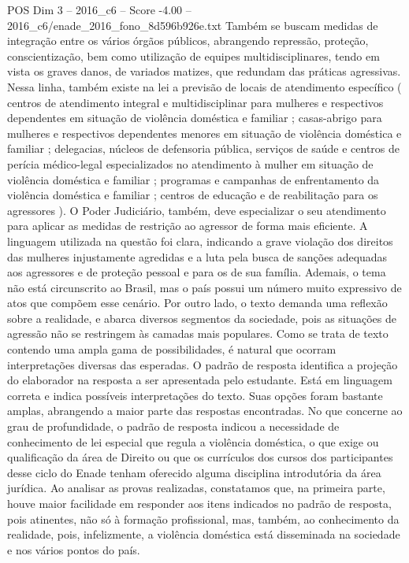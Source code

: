 \begin{textsample}{POS Dim 3 – 2016\_c6 – Score -4.00 – 2016\_c6/enade\_2016\_fono\_8d596b926e.txt}
Também se buscam medidas de integração entre os vários órgãos públicos, abrangendo repressão, proteção, conscientização, bem como utilização de equipes multidisciplinares, tendo em vista os graves danos, de variados matizes, que redundam das práticas agressivas.
Nessa linha, também existe na lei a previsão de locais de atendimento específico ( centros de atendimento integral e multidisciplinar para mulheres e respectivos dependentes em situação de violência doméstica e familiar ; casas-abrigo para mulheres e respectivos dependentes menores em situação de violência doméstica e familiar ; delegacias, núcleos de defensoria pública, serviços de saúde e centros de perícia médico-legal especializados no atendimento à mulher em situação de violência doméstica e familiar ; programas e campanhas de enfrentamento da violência doméstica e familiar ; centros de educação e de reabilitação para os agressores ).
O Poder Judiciário, também, deve especializar o seu atendimento para aplicar as medidas de restrição ao agressor de forma mais eficiente.
A linguagem utilizada na questão foi clara, indicando a grave violação dos direitos das mulheres injustamente agredidas e a luta pela busca de sanções adequadas aos agressores e de proteção pessoal e para os de sua família.
Ademais, o tema não está circunscrito ao Brasil, mas o país possui um número muito expressivo de atos que compõem esse cenário.
Por outro lado, o texto demanda uma reflexão sobre a realidade, e abarca diversos segmentos da sociedade, pois as situações de agressão não se restringem às camadas mais populares.
Como se trata de texto contendo uma ampla gama de possibilidades, é natural que ocorram interpretações diversas das esperadas.
O padrão de resposta identifica a projeção do elaborador na resposta a ser apresentada pelo estudante.
Está em linguagem correta e indica possíveis interpretações do texto.
Suas opções foram bastante amplas, abrangendo a maior parte das respostas encontradas.
No que concerne ao grau de profundidade, o padrão de resposta indicou a necessidade de conhecimento de lei especial que regula a violência doméstica, o que exige ou qualificação da área de Direito ou que os currículos dos cursos dos participantes desse ciclo do Enade tenham oferecido alguma disciplina introdutória da área jurídica.
Ao analisar as provas realizadas, constatamos que, na primeira parte, houve maior facilidade em responder aos itens indicados no padrão de resposta, pois atinentes, não só à formação profissional, mas, também, ao conhecimento da realidade, pois, infelizmente, a violência doméstica está disseminada na sociedade e nos vários pontos do país.

\end{textsample}
